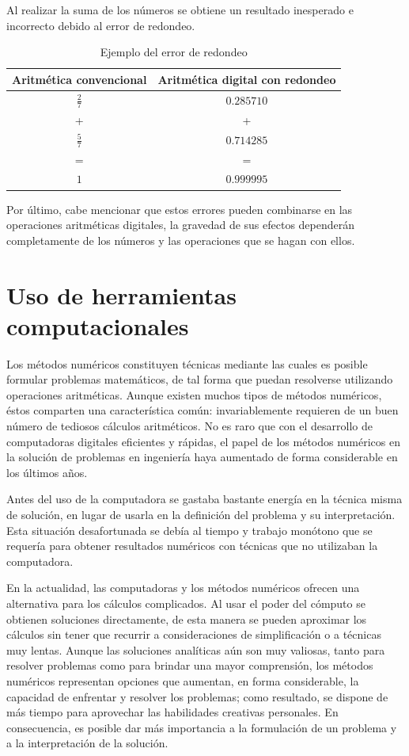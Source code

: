 Al realizar la suma de los números se obtiene un resultado inesperado e incorrecto debido al error de redondeo.

\begin{table}[ht]
	\centering
	\begin{tabular}{c|c}
	\textbf{Aritmética convencional} & \textbf{Aritmética digital con redondeo}\\
	\hline
	$\frac{2}{7}$ & $0.285710$\\
	+ & + \\
	$\frac{5}{7}$ & $0.714285$\\
	= & = \\
	$1$ & $0.999995$		
	\end{tabular}
	\caption{Ejemplo del error de redondeo}
	\label{table:errorTruncamiento}
\end{table}

Por último, cabe mencionar que estos errores pueden combinarse en las operaciones aritméticas digitales, la gravedad de sus efectos dependerán completamente 
de los números y las operaciones que se hagan con ellos.

\section{Uso de herramientas computacionales}
Los métodos numéricos constituyen técnicas mediante las cuales es posible formular problemas matemáticos, de tal forma que puedan resolverse
utilizando operaciones aritméticas. Aunque existen muchos tipos de métodos numéricos, éstos comparten una característica común: invariablemente
requieren de un buen número de tediosos cálculos aritméticos. No es raro que con el desarrollo de computadoras digitales eficientes y rápidas, 
el papel de los métodos numéricos en la solución de problemas en ingeniería haya aumentado de forma considerable en los últimos años.

Antes del uso de la computadora se gastaba bastante energía en la técnica misma de solución, en lugar de usarla en la definición del problema
y su interpretación. Esta situación desafortunada se debía al tiempo y trabajo monótono que se requería para obtener resultados numéricos con
técnicas que no utilizaban la computadora. 

En la actualidad, las computadoras y los métodos numéricos ofrecen una alternativa para los cálculos complicados. Al usar el poder del cómputo
se obtienen soluciones directamente, de esta manera se pueden aproximar los cálculos sin tener que recurrir a consideraciones de simplificación
o a técnicas muy lentas. Aunque las soluciones analíticas aún son muy valiosas, tanto para resolver problemas como para brindar una mayor
comprensión, los métodos numéricos representan opciones que aumentan, en forma considerable, la capacidad de enfrentar y resolver los problemas;
como resultado, se dispone de más tiempo para aprovechar las habilidades creativas personales. En consecuencia, es posible dar más importancia
a la formulación de un problema y a la interpretación de la solución.

